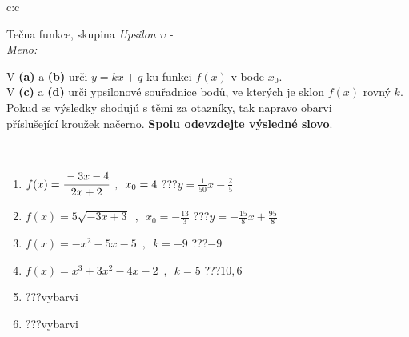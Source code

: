 \documentclass[10pt]{report}
\begin{document}
\newpage
\thispagestyle{empty}
\begin{tabular}{c:c}
\begin{minipage}[c][104.5mm][t]{0.5\linewidth}
\begin{center}
\vspace{7mm}
{\huge Tečna funkce, skupina \textit{Upsilon $\upsilon$} -}\\[5mm]
\textit{Meno:}\phantom{xxxxxxxxxxxxxxxxxxxxxxxxxxxxxxxxxxxxxxxxxxxxxxxxxxxxxxxxxxxxxxxxx}\\[5mm]
\begin{minipage}{0.95\linewidth}
\begin{center}
V \textbf{(a)} a \textbf{(b)} urči  $y = kx + q$ ku funkci $f(x)$ v bode $x_0$.\\V \textbf{(c)} a \textbf{(d)} urči ypsilonové souřadnice bodů, ve kterých je sklon $f(x)$ rovný $k$.\\Pokud se výsledky shodujú s těmi za otazníky, tak napravo obarvi\\příslušející kroužek načerno. \textbf{Spolu odevzdejte výsledné slovo}.
\end{center}
\end{minipage}
\\[1mm]
\begin{minipage}{0.79\linewidth}
\begin{center}
\begin{varwidth}{\linewidth}
\begin{enumerate}
\small
\item $f(x)=\cfrac{-3x-4}{2x+2}\enspace , \enspace x_0=4$\quad \dotfill\; ???\;\dotfill \quad $y = \frac{1}{50}x-\frac{2}{5}$
\item $f(x)=5\sqrt{-3x+3}\enspace , \enspace x_0=-\frac{13}{3}$\quad \dotfill\; ???\;\dotfill \quad $y = -\frac{15}{8}x+\frac{95}{8}$
\item $f(x)=-x^2-5x-5\enspace , \enspace k=-9$\quad \dotfill\; ???\;\dotfill \quad $-9$
\item $f(x)=x^3+3x^2-4x-2\enspace , \enspace k=5$\quad \dotfill\; ???\;\dotfill \quad $10 , 6$
\item \quad \dotfill\; ???\;\dotfill \quad vybarvi
\item \quad \dotfill\; ???\;\dotfill \quad vybarvi
\end{enumerate}
\end{varwidth}
\end{center}
\end{minipage}
\begin{minipage}{0.20\linewidth}

\end{minipage}
\end{center}
\end{minipage}
\end{tabular}
\end{document}

